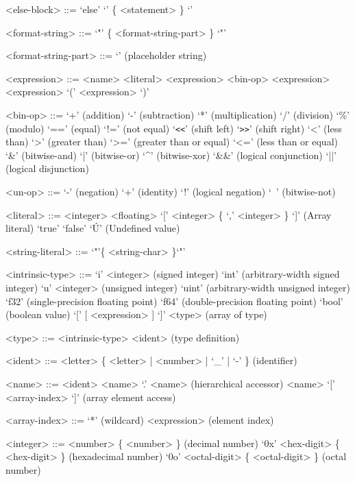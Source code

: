 \documentclass{article}
\begin{document}
\begin{grammar}
  <else-block> ::= `else' `{' \{ <statement> \} `}'

  <format-string> ::= `"' \{ <format-string-part> \} `"'
  
  <format-string-part> ::= `{}' (placeholder string)

  <expression> ::= <name>
  \alt <literal>
  \alt <expression> <bin-op> <expression>
   <expression>
  \alt `(' <expression> `)'

  <bin-op> ::= `+' (addition)
  \alt `-' (subtraction)
  \alt `*' (multiplication)
  \alt `/' (division)
  \alt `\%' (modulo)
  \alt `==' (equal)
  \alt `!=' (not equal)
  \alt `\verb!<<!' (shift left)
  \alt `\verb!>>!' (shift right)
  \alt `<' (less than)
  \alt `>' (greater than)
  \alt `>=' (greater than or equal)
  \alt `<=' (less than or equal)
  \alt `\&' (bitwise-and)
  \alt `|' (bitwise-or)
  \alt `^' (bitwise-xor)
  \alt `\&\&' (logical conjunction)
  \alt `||' (logical disjunction)

  <un-op> ::= `-' (negation)
  \alt `+' (identity)
  \alt `!' (logical negation)
  \alt `~' (bitwise-not)

  <literal> ::= <integer>
  \alt <floating>
  \alt `[' <integer> \{ `,' <integer> \} `]' (Array literal)  
  \alt `true'
  \alt `false'
  \alt `\'U' (Undefined value)

  <string-literal> ::= `"'\{ <string-char> \}`"'

  <intrinsic-type> ::= `i' <integer> (signed integer)
  \alt `int' (arbitrary-width signed integer)
  \alt `u' <integer> (unsigned integer)
  \alt `uint' (arbitrary-width unsigned integer)
  \alt `f32' (single-precision floating point)
  \alt `f64' (double-precision floating point)
  \alt `bool' (boolean value)
  \alt `[' [ <expression> ] `]' <type> (array of type)

  <type> ::= <intrinsic-type>
  \alt <ident> (type definition)

  <ident> ::= <letter> \{ <letter> | <number> | `_' | `-' \} (identifier)

  <name> ::= <ident>
  \alt <name> `.' <name> (hierarchical accessor)
  \alt <name> `[' <array-index> `]' (array element access)

  <array-index> ::= `*' (wildcard)
  \alt <expression> (element index)

  <integer> ::= <number> \{ <number> \} (decimal number)
  \alt `0x' <hex-digit> \{ <hex-digit> \} (hexadecimal number)
  \alt `0o' <octal-digit> \{ <octal-digit> \} (octal number)


\end{grammar}
\end{document}
